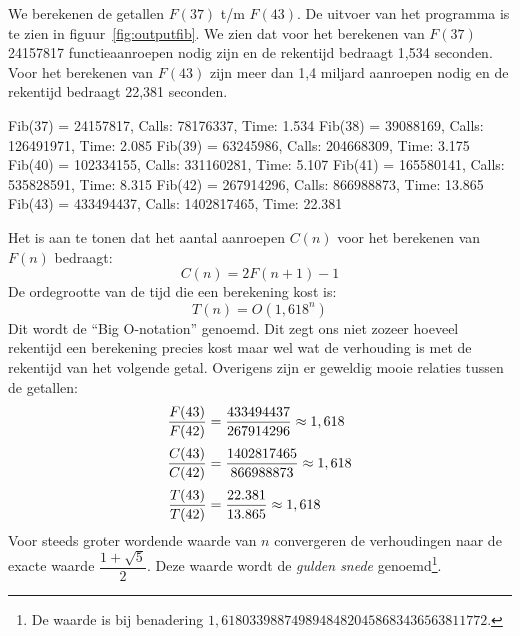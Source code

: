 
We berekenen de getallen $F(37)$ t/m $F(43)$. De uitvoer van het programma is te zien in figuur~\ref{fig:outputfib}. We zien dat voor het berekenen van $F(37)$ 24157817 functieaanroepen nodig zijn en de rekentijd bedraagt 1,534 seconden. Voor het berekenen van $F(43)$ zijn meer dan 1,4 miljard aanroepen nodig en de rekentijd bedraagt 22,381 seconden.

\begin{dosbox}[title=Uitvoer van een Fibonacci-programma.,label=fig:outputfib]
Fib(37) = 24157817, Calls: 78176337, Time: 1.534
Fib(38) = 39088169, Calls: 126491971, Time: 2.085
Fib(39) = 63245986, Calls: 204668309, Time: 3.175
Fib(40) = 102334155, Calls: 331160281, Time: 5.107
Fib(41) = 165580141, Calls: 535828591, Time: 8.315
Fib(42) = 267914296, Calls: 866988873, Time: 13.865
Fib(43) = 433494437, Calls: 1402817465, Time: 22.381
\end{dosbox}

Het is aan te tonen dat het aantal aanroepen $C(n)$ voor het berekenen van $F(n)$ bedraagt:
%
\begin{equation}
C(n) = 2F(n+1)-1
\end{equation}
%
De ordegrootte van de tijd die een berekening kost is:
%
\begin{equation}
T(n) = O(1,618^n)
\end{equation}
%
Dit wordt de ``Big O-notation'' genoemd. Dit zegt ons niet zozeer hoeveel rekentijd een berekening precies kost maar wel wat de verhouding is met de rekentijd van het volgende getal. Overigens zijn er geweldig mooie relaties tussen de getallen:
%
\begin{equation}
\jot=5pt
\begin{split}
\dfrac{F(43)}{F(42)} &= \dfrac{433494437}{267914296}\approx 1,618\\
\dfrac{C(43)}{C(42)} &= \dfrac{1402817465}{866988873}\approx 1,618\\
\dfrac{T(43)}{T(42)} &= \dfrac{22.381}{13.865}\approx 1,618
\end{split}\end{equation}
%
Voor steeds groter wordende waarde van $n$ convergeren de verhoudingen naar de exacte waarde $\dfrac{1+\sqrt{5}}{2}$. Deze waarde wordt de \textsl{gulden snede} genoemd\footnote{De waarde is bij benadering $1,61803398874989484820458683436563811772$.}.
\basic


